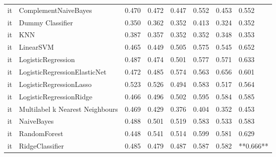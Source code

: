 \begin{tabular}{llllllll}
      it &            ComplementNaiveBayes & 0.470 &                     0.472 &                 0.447 &                  0.552 &                                   0.453 &     0.552 \\
      it &                Dummy Classifier & 0.350 &                     0.362 &                 0.352 &                  0.413 &                                   0.324 &     0.352 \\
      it &                             KNN & 0.387 &                     0.357 &                 0.352 &                  0.352 &                                   0.348 &     0.353 \\
      it &                       LinearSVM & 0.465 &                     0.449 &                 0.505 &                  0.575 &                                   0.545 &     0.652 \\
      it &              LogisticRegression & 0.487 &                     0.474 &                 0.501 &                  0.577 &                                   0.571 &     0.633 \\
      it &    LogisticRegressionElasticNet & 0.472 &                     0.485 &                 0.574 &                  0.563 &                                   0.656 &     0.601 \\
      it &         LogisticRegressionLasso & 0.523 &                     0.526 &                 0.494 &                  0.583 &                                   0.517 &     0.564 \\
      it &         LogisticRegressionRidge & 0.466 &                     0.496 &                 0.502 &                  0.595 &                                   0.584 &     0.585 \\
      it & Multilabel k Nearest Neighbours & 0.469 &                     0.429 &                 0.376 &                  0.404 &                                   0.352 &     0.453 \\
      it &                      NaiveBayes & 0.488 &                     0.501 &                 0.519 &                  0.583 &                                   0.533 &     0.583 \\
      it &                    RandomForest & 0.448 &                     0.541 &                 0.514 &                  0.599 &                                   0.581 &     0.629 \\
      it &                 RidgeClassifier & 0.485 &                     0.479 &                 0.487 &                  0.587 &                                   0.582 & **0.666** \\

\end{tabular}
